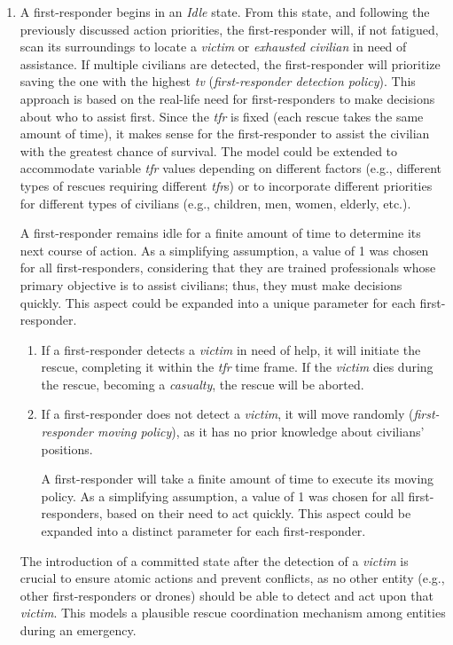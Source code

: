 \begin{enumerate}
	\item A first-responder begins in an \textit{Idle} state. From this state, and following the previously discussed action priorities, the first-responder will, if not fatigued, scan its surroundings to locate a \textit{victim} or \textit{exhausted civilian} in need of assistance. If multiple civilians are detected, the first-responder will prioritize saving the one with the highest \textit{tv} (\textit{first-responder detection policy}). This approach is based on the real-life need for first-responders to make decisions about who to assist first. Since the \textit{tfr} is fixed (each rescue takes the same amount of time), it makes sense for the first-responder to assist the civilian with the greatest chance of survival. The model could be extended to accommodate variable \textit{tfr} values depending on different factors (e.g., different types of rescues requiring different \textit{tfr}s) or to incorporate different priorities for different types of civilians (e.g., children, men, women, elderly, etc.).
	
	A first-responder remains idle for a finite amount of time to determine its next course of action. As a simplifying assumption, a value of 1 was chosen for all first-responders, considering that they are trained professionals whose primary objective is to assist civilians; thus, they must make decisions quickly. This aspect could be expanded into a unique parameter for each first-responder.
	\begin{enumerate}
		\item If a first-responder detects a \textit{victim} in need of help, it will initiate the rescue, completing it within the \textit{tfr} time frame. If the \textit{victim} dies during the rescue, becoming a \textit{casualty}, the rescue will be aborted.
		\item If a first-responder does not detect a \textit{victim}, it will move randomly (\textit{first-responder moving policy}), as it has no prior knowledge about civilians’ positions.
		
		A first-responder will take a finite amount of time to execute its moving policy. As a simplifying assumption, a value of 1 was chosen for all first-responders, based on their need to act quickly. This aspect could be expanded into a distinct parameter for each first-responder.
	\end{enumerate}
	
	The introduction of a committed state after the detection of a \textit{victim} is crucial to ensure atomic actions and prevent conflicts, as no other entity (e.g., other first-responders or drones) should be able to detect and act upon that \textit{victim}. This models a plausible rescue coordination mechanism among entities during an emergency.
	

\end{enumerate}
